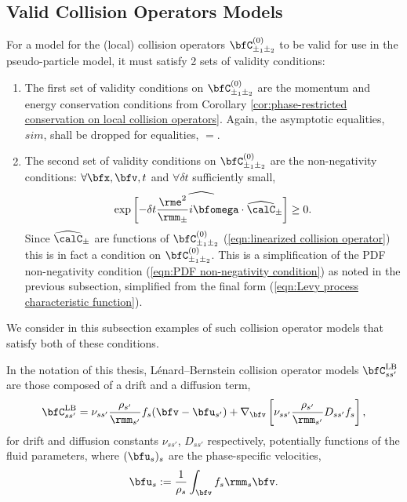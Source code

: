 \subsection{Valid Collision Operators Models}\label{cha:collision operators}
    For a model for the (local) collision operators $\bfC_{\pm_{1}\pm_{2}}^{(0)}$ to be valid for use in the pseudo-particle model, it must satisfy 2 sets of validity conditions:
    \begin{enumerate}
        \item  The first set of validity conditions on $\bfC_{\pm_{1}\pm_{2}}^{(0)}$ are the momentum and energy conservation conditions from Corollary \ref{cor:phase-restricted conservation on local collision operators}. Again, the asymptotic equalities, $sim$, shall be dropped for equalities, $=$.

        \item  The second set of validity conditions on $\bfC_{\pm_{1}\pm_{2}}^{(0)}$ are the non-negativity conditions: $\forall \bfx, \bfv, t$ and $\forall \delta t$ sufficiently small,
        \begin{equation}\label{eqn:linearized collision operator non-negativity}
            \widehat{\exp\left[- \delta t\frac{\rme^{2}}{\rmm_{\pm}}i\bfomega\cdot\widehat{\calC}_{\pm}\right]}  \geq  0.
        \end{equation}
        Since $\widehat{\calC}_{\pm}$ are functions of $\bfC_{\pm_{1}\pm_{2}}^{(0)}$ (\ref{eqn:linearized collision operator}) this is in fact a condition on $\bfC_{\pm_{1}\pm_{2}}^{(0)}$. This is a simplification of the PDF non-negativity condition (\ref{eqn:PDF non-negativity condition}) as noted in the previous subsection, simplified from the final form (\ref{eqn:Levy process characteristic function}).
    \end{enumerate}
    
    We consider in this subsection examples of such collision operator models that satisfy both of these conditions.

    \line

    \begin{definition}
        In the notation of this thesis, Lénard--Bernstein collision operator models $\bfC_{ss'}^{\rm LB}$ are those composed of a drift and a diffusion term,
        \begin{equation}\label{eqn:Lénard--Bernstein operator}
            \bfC_{ss'}^{\rm LB}  =  \nu_{ss'}\frac{\rho_{s'}}{\rmm_{s'}}f_{s}(\bfv - \bfu_{s'}) + \nabla_{\bfv}\left[\nu_{ss'}\frac{\rho_{s'}}{\rmm_{s'}}D_{ss'}f_{s}\right],
        \end{equation}
        for drift and diffusion constants $\nu_{ss'}$, $D_{ss'}$ respectively, potentially functions of the fluid parameters, where $(\bfu_{s})_{s}$ are the phase-specific velocities,
        \begin{equation}
            \bfu_{s}  :=  \frac{1}{\rho_{s}}\int_{\bfv}f_{s}\rmm_{s}\bfv.
        \end{equation}
    \end{definition}

